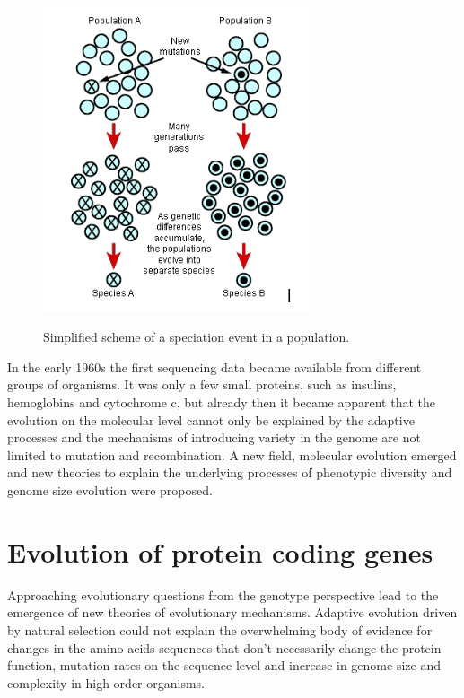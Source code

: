 \documentclass[11pt, a4paper,oneside]{report}
\begin{document}
\begin{figure}[ht]
\begin{center}
\label{img:populations}
\includegraphics[width=0.7\textwidth]{figures/populations.png}
\end{center}
\caption{Simplified scheme of a speciation event in a population.} 
\end{figure}

In the early 1960s the first sequencing data became available from different groups of organisms. It was only a few small proteins, such as insulins\cite{Sanger1945}, hemoglobins\cite{INGRAM1956} and cytochrome c, but already then it became apparent that the evolution on the molecular level cannot only be explained by the adaptive processes\cite{King1969} and the mechanisms of introducing variety in the genome are not limited to mutation and recombination. A new field, molecular evolution emerged and new theories to explain the underlying processes of phenotypic diversity and genome size evolution were proposed.  
\section{Evolution of protein coding genes}
 Approaching evolutionary questions from the genotype perspective lead to the emergence of new theories of evolutionary mechanisms. Adaptive evolution driven by natural selection could not explain the overwhelming body of evidence for changes in the amino acids sequences that don't necessarily change the protein function, mutation rates on the sequence level and increase in genome size and complexity in high order organisms. 
 
\end{document}
